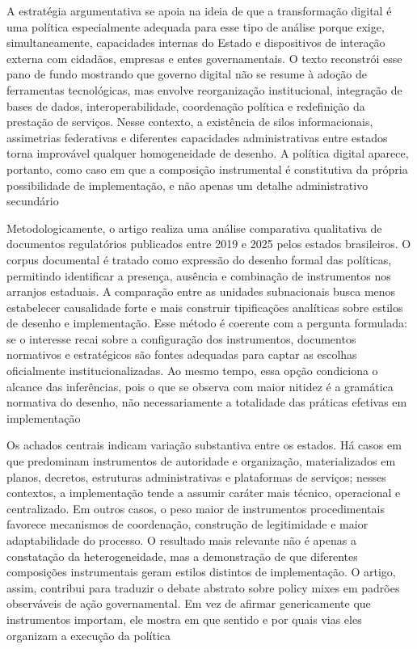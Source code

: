 \documentclass[12pt,a4paper]{article}
\begin{document}
A estratégia argumentativa se apoia na ideia de que a transformação digital é uma política especialmente adequada para esse tipo de análise porque exige, simultaneamente, capacidades internas do Estado e dispositivos de interação externa com cidadãos, empresas e entes governamentais. O texto reconstrói esse pano de fundo mostrando que governo digital não se resume à adoção de ferramentas tecnológicas, mas envolve reorganização institucional, integração de bases de dados, interoperabilidade, coordenação política e redefinição da prestação de serviços. Nesse contexto, a existência de silos informacionais, assimetrias federativas e diferentes capacidades administrativas entre estados torna improvável qualquer homogeneidade de desenho. A política digital aparece, portanto, como caso em que a composição instrumental é constitutiva da própria possibilidade de implementação, e não apenas um detalhe administrativo secundário\parencite{lui2026_micro_dimensions}

Metodologicamente, o artigo realiza uma análise comparativa qualitativa de documentos regulatórios publicados entre 2019 e 2025 pelos estados brasileiros. O corpus documental é tratado como expressão do desenho formal das políticas, permitindo identificar a presença, ausência e combinação de instrumentos nos arranjos estaduais. A comparação entre as unidades subnacionais busca menos estabelecer causalidade forte e mais construir tipificações analíticas sobre estilos de desenho e implementação. Esse método é coerente com a pergunta formulada: se o interesse recai sobre a configuração dos instrumentos, documentos normativos e estratégicos são fontes adequadas para captar as escolhas oficialmente institucionalizadas. Ao mesmo tempo, essa opção condiciona o alcance das inferências, pois o que se observa com maior nitidez é a gramática normativa do desenho, não necessariamente a totalidade das práticas efetivas em implementação\parencite{lui2026_micro_dimensions}

Os achados centrais indicam variação substantiva entre os estados. Há casos em que predominam instrumentos de autoridade e organização, materializados em planos, decretos, estruturas administrativas e plataformas de serviços; nesses contextos, a implementação tende a assumir caráter mais técnico, operacional e centralizado. Em outros casos, o peso maior de instrumentos procedimentais favorece mecanismos de coordenação, construção de legitimidade e maior adaptabilidade do processo. O resultado mais relevante não é apenas a constatação da heterogeneidade, mas a demonstração de que diferentes composições instrumentais geram estilos distintos de implementação. O artigo, assim, contribui para traduzir o debate abstrato sobre policy mixes em padrões observáveis de ação governamental. Em vez de afirmar genericamente que instrumentos importam, ele mostra em que sentido e por quais vias eles organizam a execução da política\parencite{lui2026_micro_dimensions}
\end{document}
